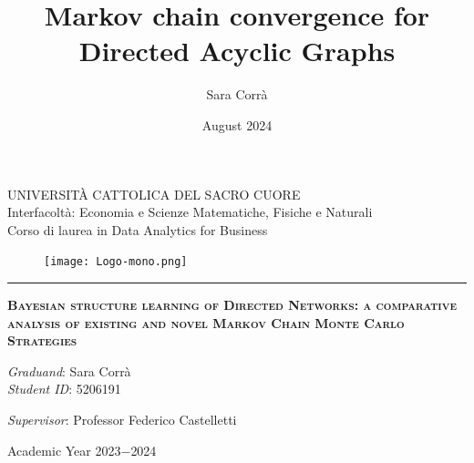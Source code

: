 \documentclass{report}
\title{Markov chain convergence for Directed Acyclic Graphs}
\author{Sara Corrà}
\date{August 2024}
\begin{document}
	
\pagestyle{empty}

\vspace*{-1.5cm}

\begin{center}
	\large
	UNIVERSIT\`{A} CATTOLICA DEL SACRO CUORE \\
	\normalsize
	Interfacoltà: Economia e Scienze Matematiche, Fisiche e Naturali \\
	Corso di laurea in Data Analytics for Business \\
	
	\begin{figure}[H]
		\centering
		\texttt{[image: Logo-mono.png]}
	\end{figure}
	\vspace*{-0.6cm}
	\noindent\rule{4cm}{0.2pt}
	\vspace*{3cm}	
	
	\huge{\textbf{\textsc{{Bayesian structure learning of Directed Networks: a comparative analysis of existing and novel Markov Chain Monte Carlo Strategies}}}}
	
	\vspace*{.75truecm}
\end{center}

\vfill
\vfill

\large

\begin{flushright}
	\emph{Graduand}: Sara Corrà \\
	\emph{Student ID}: 5206191 \\
\end{flushright}

\vspace*{1.0cm}
\noindent \emph{Supervisor}: Professor Federico Castelletti \\

\vspace*{0.1cm}


\vfill
\vfill

\begin{center}
	Academic Year 2023$-$2024
\end{center}


\normalsize
\end{document}
